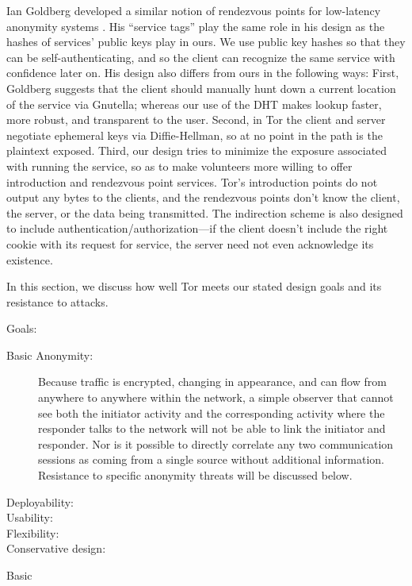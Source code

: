 \documentclass[times,10pt,twocolumn]{article}
\begin{document}
Ian Goldberg developed a similar notion of rendezvous points for
low-latency anonymity systems \cite{ian-thesis}. His ``service tags''
play the same role in his design as the hashes of services' public
keys play in ours.  We use public key hashes so that they can be
self-authenticating, and so the client can recognize the same service
with confidence later on. His design also differs from ours in the
following ways: First, Goldberg suggests that the client should
manually hunt down a current location of the service via Gnutella;
whereas our use of the DHT makes lookup faster, more robust, and
transparent to the user. Second, in Tor the client and server
negotiate ephemeral keys via Diffie-Hellman, so at no point in the
path is the plaintext exposed. Third, our design tries to minimize the
exposure associated with running the service, so as to make volunteers
more willing to offer introduction and rendezvous point services.
Tor's introduction points do not output any bytes to the clients, and
the rendezvous points don't know the client, the server, or the data
being transmitted. The indirection scheme is also designed to include
authentication/authorization---if the client doesn't include the right
cookie with its request for service, the server need not even
acknowledge its existence.

\label{sec:analysis}

In this section, we discuss how well Tor meets our stated design goals
and its resistance to attacks.

Goals:
\begin{description}
\item [Basic Anonymity:] Because traffic is encrypted, changing in
  appearance, and can flow from anywhere to anywhere within the
  network, a simple observer that cannot see both the initiator
  activity and the corresponding activity where the responder talks to
  the network will not be able to link the initiator and responder.
  Nor is it possible to directly correlate any two communication
  sessions as coming from a single source without additional
  information. Resistance to specific anonymity threats will be discussed
  below.

\item[Deployability:]

\item[Usability:] 
\item[Flexibility:] 
\item[Conservative design:] 
\end{description}
Basic 
\end{document}
